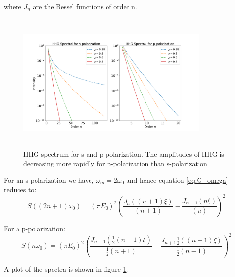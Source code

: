 \documentclass[12pt]{article}
\begin{document}
where $J_n$ are the Bessel functions of order n.

\begin{figure}[h]
    \centering
    \includegraphics[width=0.85\textwidth, height=7cm]{images/spectrum.png}
    \caption{HHG spectrum for s and p polarization. The amplitudes of HHG is decreasing more rapidly for p-polarization than s-polarization}
    \label{fig:spectrum}
\end{figure}

For an s-polarization we have, $\omega_m = 2 \omega_0$ and hence equation \ref{eq:G_omega} reduces to:
\begin{equation}
    \label{eq:s-spectrum}
    S((2n+1)\omega_0) = (\pi E_0)^2\left(\frac{J_n((n+1)\xi)}{(n+1)}- \frac{J_{n+1}(n\xi)}{(n)}\right)^2
\end{equation}

For a p-polarization:
\begin{equation}
    \label{eq:p-spectrum}
    S(n\omega_0) = (\pi E_0)^2\left(\frac{J_{n-1}(\frac{1}{2}(n+1)\xi)}{\frac{1}{2}(n+1)}- \frac{J_{n+1}\frac{1}{2}((n-1)\xi)}{\frac{1}{2}(n-1)}\right)^2
\end{equation}

A plot of the spectra is shown in figure \ref{fig:spectrum}.
\end{document}
